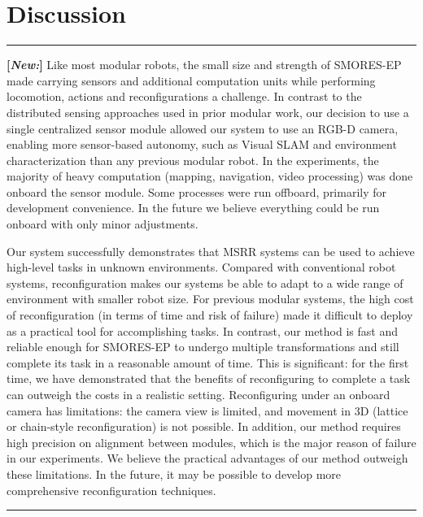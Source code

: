 \documentclass[conference]{IEEEtran}
\newcommand{\separator}{ \noindent \rule{\columnwidth}{1pt} }
\newenvironment{new}{\color{Blue} \separator \textbf{[\textit{New:}]} }{\ignorespacesafterend \separator}
\begin{document}
\section{Discussion}
\label{sec:discussion}
%
\begin{new}
Like most modular robots, the small size and strength of SMORES-EP made carrying sensors and additional computation units while performing locomotion, actions and reconfigurations a challenge.  
In contrast to the distributed sensing approaches used in prior modular work, our decision to use a single centralized sensor module allowed our system to use an RGB-D camera, enabling more sensor-based autonomy, such as Visual SLAM and environment characterization than any previous modular robot.  
In the experiments, the majority of heavy computation (mapping, navigation, video processing) was done onboard the sensor module.  
Some processes were run offboard, primarily for development convenience.  
In the future we believe everything could be run onboard with only minor adjustments.

Our system successfully demonstrates that MSRR systems can be used to achieve high-level tasks in unknown environments.
Compared with conventional robot systems, reconfiguration makes our systems be able to adapt to a wide range of environment with smaller robot size. 
For previous modular systems, the high cost of reconfiguration (in terms of time and risk of failure) made it difficult to deploy as a practical tool for accomplishing tasks.  
In contrast, our method is fast and reliable enough for SMORES-EP to undergo multiple transformations and still complete its task in a reasonable amount of time.  
This is significant: for the first time, we have demonstrated that the benefits of reconfiguring to complete a task can outweigh the costs in a realistic setting.  
Reconfiguring under an onboard camera has limitations: the camera view is limited, and movement in 3D (lattice or chain-style reconfiguration) is not possible. 
In addition, our method requires high precision on alignment between modules, which is the major reason of failure in our experiments. 
We believe the practical advantages of our method outweigh these limitations.  
In the future, it may be possible to develop more comprehensive reconfiguration techniques.


\end{new}
\end{document}
